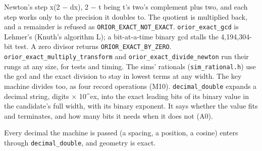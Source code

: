 \begin{description}
Newton's step x(2 − dx), 2 − t being t's two's complement plus two, and each step works only to the precision it doubles to. The quotient is multiplied back, and a remainder is refused as \texttt{ORIOR\_\allowbreak{}EXACT\_\allowbreak{}NOT\_\allowbreak{}EXACT}. \texttt{orior\_\allowbreak{}exact\_\allowbreak{}gcd} is Lehmer's (Knuth's algorithm L); a bit-at-a-time binary gcd stalls the 4,194,304-bit test. A zero divisor returns \texttt{ORIOR\_\allowbreak{}EXACT\_\allowbreak{}BY\_\allowbreak{}ZERO}. \texttt{orior\_\allowbreak{}exact\_\allowbreak{}multiply\_\allowbreak{}transform} and \texttt{orior\_\allowbreak{}exact\_\allowbreak{}divide\_\allowbreak{}newton} run their rungs at any size, for tests and timing. The sims' rationals (\texttt{sim\_\allowbreak{}rational.\allowbreak{}h}) use the gcd and the exact division to stay in lowest terms at any width. The key machine divides too, as four record operations (M10). \texttt{decimal\_\allowbreak{}double} expands a decimal string, digits × 10\textasciicircum{}ex, into the exact leading bits of its binary value in the candidate's full width, with its binary exponent. It says whether the value fits and terminates, and how many bits it needs when it does not (A0).
\item[{wants}] Every decimal the machine is passed (a spacing, a position, a cosine) enters through \texttt{decimal\_\allowbreak{}double}, and geometry is exact.

\end{description}
